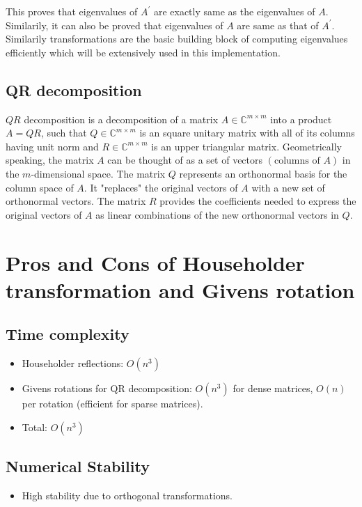 \documentclass[12pt]{article}
\numberwithin{equation}{section}
\newcommand{\brak}[1]{\ensuremath{\left(#1\right)}}
\newcommand{\defmat}[2]{#1\in\mathbb{C}^{#2\times#2}}
\begin{document}
This proves that eigenvalues of $A^{\prime}$ are exactly same as the eigenvalues of $A$. Similarily, it can also be proved that eigenvalues of $A$ are same as that of $A^{\prime}$.
\newline
Similarily transformations are the basic building block of computing eigenvalues efficiently which will be extensively used in this implementation.

\subsection{QR decomposition} \label{qrth}
$QR$ decomposition is a decomposition of a matrix $\defmat{A}{m}$ into a product $A = QR$, such that $\defmat{Q}{m}$ is an square unitary matrix with all of its columns having unit norm and $\defmat{R}{m}$ is an upper triangular matrix. 
\newline
\newline
Geometrically speaking, the matrix $A$ can be thought of as a set of vectors \brak{\text{columns of } A} in the $m$-dimensional space.
The matrix $Q$ represents an orthonormal basis for the column space of $A$. It "replaces" the original vectors of $A$ with a new set of orthonormal vectors.
The matrix $R$ provides the coefficients needed to express the original vectors of $A$ as linear combinations of the new orthonormal vectors in $Q$.

\section{Pros and Cons of Householder transformation and Givens rotation}
\subsection{Time complexity}
\begin{itemize}
    \item Householder reflections: $O\brak{n^3}$
    \item Givens rotations for QR decomposition: $O\brak{n^3}$ for dense matrices, $O\brak{n}$ per rotation (efficient for sparse matrices).
    \item Total: $O\brak{n^3}$
\end{itemize}

\subsection{Numerical Stability}
\begin{itemize}
    \item High stability due to orthogonal transformations.
\end{itemize}
\end{document}
